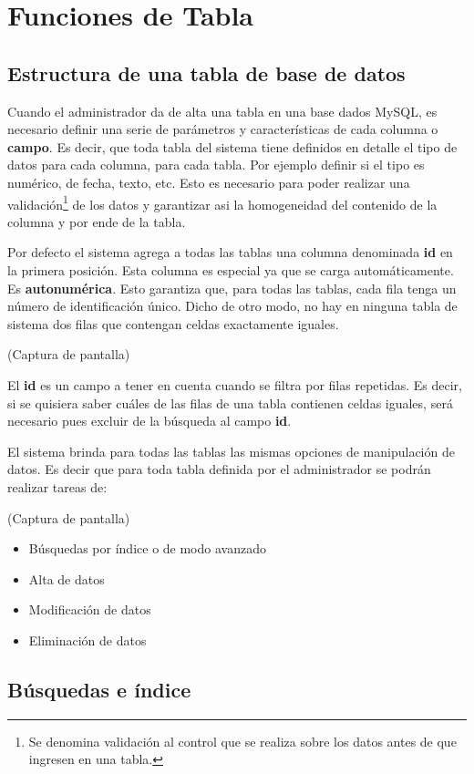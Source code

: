 \documentclass[a4paper,10pt]{article}
\begin{document}
\section{Funciones de Tabla}
\subsection{Estructura de una tabla de base de datos}

Cuando el administrador da de alta una tabla en una base dados MySQL, es necesario definir una serie de parámetros y características de cada columna o \textbf{campo}. Es decir, que toda tabla del sistema tiene definidos en detalle el tipo de datos para cada columna, para cada tabla. Por ejemplo definir si el tipo es numérico, de fecha, texto, etc. Esto es necesario para poder realizar una validación\footnote{Se denomina validación al control que se realiza sobre los datos antes de que ingresen en una tabla.} de los datos y garantizar asi la homogeneidad del contenido de la columna y por ende de la tabla.

Por defecto el sistema agrega a todas las tablas una columna denominada \textbf{id} en la primera posición. Esta columna es especial ya que se carga automáticamente. Es \textbf{autonumérica}. Esto garantiza que, para todas las tablas, cada fila tenga un número de identificación único. Dicho de otro modo, no hay en ninguna tabla de sistema dos filas que contengan celdas exactamente iguales.

(Captura de pantalla)

El \textbf{id} es un campo a tener en cuenta cuando se filtra por filas repetidas. Es decir, si se quisiera saber cuáles de las filas de una tabla contienen celdas iguales, será necesario pues excluir de la búsqueda al campo \textbf{id}.

El sistema brinda para todas las tablas las mismas opciones de manipulación de datos. Es decir que para toda tabla definida por el administrador se podrán realizar tareas de:

(Captura de pantalla)

\begin{itemize}
 \item Búsquedas por índice o de modo avanzado
 \item Alta de datos
 \item Modificación de datos 
 \item Eliminación de datos
\end{itemize}

\subsection{Búsquedas e índice}
\end{document}
